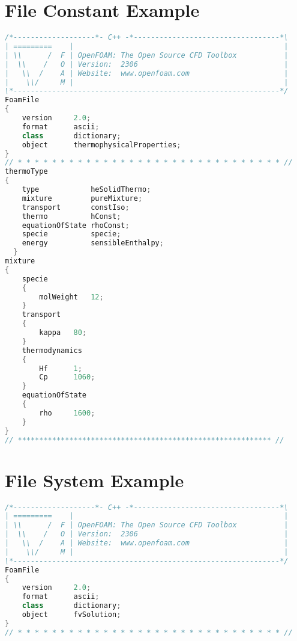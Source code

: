 \begin{theappendices}
\chapter{File Constant Example}
\begin{lstlisting}[language=c++, caption=OF dictiorary in $constant/Brick/thermoPhysicalProperties$]
/*-------------------*- C++ -*----------------------------------*\
| =========    |                                                 |
| \\      /  F | OpenFOAM: The Open Source CFD Toolbox           |
|  \\    /   O | Version:  2306                                  |
|   \\  /    A | Website:  www.openfoam.com                      |
|    \\/     M |                                                 |
\*--------------------------------------------------------------*/
FoamFile
{
    version     2.0;
    format      ascii;
    class       dictionary;
    object      thermophysicalProperties;
}
// * * * * * * * * * * * * * * * * * * * * * * * * * * * * * * * //
thermoType
{
    type            heSolidThermo;
    mixture         pureMixture;
    transport       constIso;
    thermo          hConst;
    equationOfState rhoConst;
    specie          specie;
    energy          sensibleEnthalpy;
  }
mixture
{
    specie
    {
        molWeight   12;
    }
    transport
    {
        kappa   80;
    }
    thermodynamics
    {
        Hf      1;
        Cp      1060;
    }
    equationOfState
    {
        rho     1600;
    }
}
// *********************************************************** //
\end{lstlisting}






\singlespacing
\chapter{File System Example}
\begin{lstlisting}[language=c++, caption=OF dictiorary in $system/Brick/fvSolution$]
/*-------------------*- C++ -*----------------------------------*\
| =========    |                                                 |
| \\      /  F | OpenFOAM: The Open Source CFD Toolbox           |
|  \\    /   O | Version:  2306                                  |
|   \\  /    A | Website:  www.openfoam.com                      |
|    \\/     M |                                                 |
\*--------------------------------------------------------------*/
FoamFile
{
    version     2.0;
    format      ascii;
    class       dictionary;
    object      fvSolution;
}
// * * * * * * * * * * * * * * * * * * * * * * * * * * * * * * * //


\end{lstlisting}
\end{theappendices}
